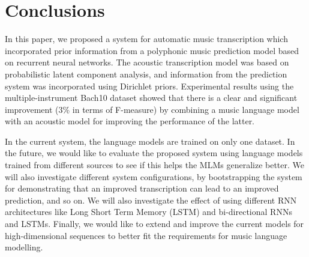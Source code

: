 \section{Conclusions} \label{sec:conclusions}

In this paper, we proposed a system for automatic music transcription which incorporated prior information from a polyphonic music prediction model based on recurrent neural networks. The acoustic transcription model was based on probabilistic latent component analysis, and information from the prediction system was incorporated using Dirichlet priors. Experimental results using the multiple-instrument Bach10 dataset showed that there is a clear and significant improvement (3\% in terms of F-measure) by combining a music language model with an acoustic model for improving the performance of the latter.

In the current system, the language models are trained  on only one dataset. In the future, we would like to evaluate the proposed system using language models trained from different sources to see if this helps the MLMs generalize better. We will also investigate different system configurations, by bootstrapping the system for demonstrating that an improved transcription can lead to an improved prediction, and so on. We will also investigate the effect of using different RNN architectures like Long Short Term Memory (LSTM) and bi-directional RNNs and LSTMs. Finally, we would like to extend and improve the current models for high-dimensional sequences to better fit the requirements for music language modelling. 